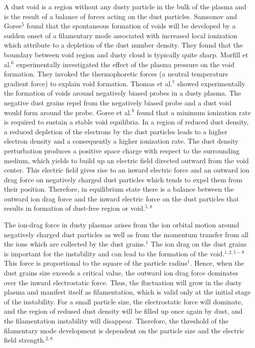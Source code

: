 A dust void is a region without any dusty particle in the bulk of
the plasma and is the result of a balance of forces acting on the
dust particles. Samsonov and Goree$^{5}$ found that the spontaneous
formation of voids will be developed by a sudden onset of a
filamentary mode associated with increased local ionization which
attribute to a depletion of the dust number density. They found that
the boundary between void region and dusty cloud is typically quite
sharp. Morfill et al.$^{6}$ experimentally investigated the effect
of the plasma pressure on the void formation. They invoked the
thermophoretic forces (a neutral temperature gradient force) to
explain void formation. Thomas et al.$^{7}$ showed experimentally
the formation of voids around negatively biased probes in a dusty
plasma. The negative dust grains repel from the negatively biased
probe and a dust void would form around the probe. Goree et
al.$^{8}$ found that a minimum ionization rate is required to
sustain a stable void equilibria. In a region of reduced dust
density, a reduced depletion of the electrons by the dust particles
leads to a higher electron density and a consequently a higher
ionization rate. The dust density perturbation produces a positive
space charge with respect to the surrounding medium, which yields to
build up an electric field directed outward from the void center.
This electric field gives rise to an inward electric force and an
outward ion drag force on negatively charged dust particles which
tends to expel them from their position. Therefore, in equilibrium
state there is a balance between the outward ion drag force and the
inward electric force on the dust particles that results in
formation of dust-free region or void.$^{5,8}$

The ion-drag force in dusty plasmas arises from the ion orbital
motion around negatively charged dust particles as well as from the
momentum transfer from all the ions which are collected by the dust
grains.$^{1}$ The ion drag on the dust grains is important for the
instability and can lead to the formation of the void.$^{1,2,5-8}$
This force is proportional to the square of the particle
radius$^{1}$. Hence, when the dust grains size exceeds a critical
value, the outward ion drag force dominates over the inward
electrostatic force. Thus, the fluctuation will grow in the dusty
plasma and manifest itself as filamentation, which is valid only at
the initial stage of the instability. For a small particle size, the
electrostatic force will dominate, and the region of redused dust
density will be filled up once again by dust, and the filamentation
instability will disappear. Therefore, the threshold of the
filamentary mode development is dependent on the particle size and
the electric field strength.$^{2,8}$

